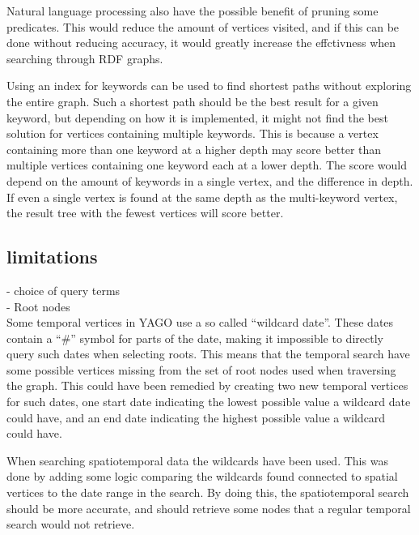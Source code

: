 Natural language processing also have the possible benefit of pruning some predicates. This would reduce the amount of vertices visited, and if this can be done without reducing accuracy, it would greatly increase the effctivness when searching through RDF graphs.

Using an index for keywords can be used to find shortest paths without exploring the entire graph. Such a shortest path should be the best result for a given keyword, but depending on how it is implemented, it might not find the best solution for vertices containing multiple keywords. This is because a vertex containing more than one keyword at a higher depth may score better than multiple vertices containing one keyword each at a lower depth. The score would depend on the amount of keywords in a single vertex, and the difference in depth. If even a single vertex is found at the same depth as the multi-keyword vertex, the result tree with the fewest vertices will score better. 


\subsection{limitations}
- choice of query terms\\
- Root nodes\\

Some temporal vertices in YAGO use a so called ``wildcard date''. These dates contain a ``\#'' symbol for parts of the date, making it impossible to directly query such dates when selecting roots. This means that the temporal search have some possible vertices missing from the set of root nodes used when traversing the graph. This could have been remedied by creating two new temporal vertices for such dates, one start date indicating the lowest possible value a wildcard date could have, and an end date indicating the highest possible value a wildcard could have.

When searching spatiotemporal data the wildcards have been used. This was done by adding some logic comparing the wildcards found connected to spatial vertices to the date range in the search. By doing this, the spatiotemporal search should be more accurate, and should retrieve some nodes that a regular temporal search would not retrieve.

